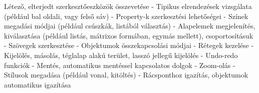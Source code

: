 

Létező, elterjedt szerkesztőeszközök összevetése
- Tipikus elrendezések vizsgálata (például bal oldali, vagy felső sáv)
- Property-k szerkesztési lehetőségei
- Színek megadási módjai (például csúszkák, listából választás)
- Alapelemek megjelenítés, kiválasztása (például listás, mátrixos formában, egymás mellett), csoportosításuk
- Szövegek szerkesztése
- Objektumok összekapcsolási módjai
- Rétegek kezelése
- Kijelölés, másolás, téglalap alakú terület, lasszó jellegű kijelölés
- Undo-redo funkciók
- Mentés, automatikus mentéssel kapcsolatos dolgok
- Zoom-olás
- Stílusok megadása (például vonal, kitöltés)
- Rácsponthoz igazítás, objektumok automatikus igazítása

